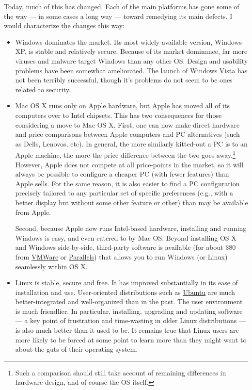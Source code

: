 \documentclass[11pt,article,oneside]{memoir}
\begin{document}
Today, much of this has changed. Each of the main platforms has gone some of the way --- in some cases a long way --- toward remedying its main defects. I would characterize the changes this way: 

\begin{itemize}
	\item Windows dominates the market. Its most widely-available version, Windows XP, is stable and relatively secure. Because of its market dominance, far more viruses and malware target Windows than any other OS. Design and usability problems have been somewhat ameliorated. The launch of Windows Vista has not been terribly successful, though it's problems do not seem to be ones related to security.

	\item Mac OS X runs only on Apple hardware, but Apple has moved all of its computers over to Intel chipsets. This has two consequences for those considering a move to Mac OS X. First, one can now make direct hardware and price comparisons between Apple computers and PC alternatives (such as Dells, Lenovos, etc). In general, the more similarly kitted-out a PC is to an Apple machine, the more the price difference between the two goes away.\footnote{Such a comparison should still take account of remaining differences in hardware design, and of course the OS itself.} However, Apple does not compete at all price-points in the market, so it will always be possible to configure a cheaper PC (with fewer features) than Apple sells. For the same reason, it is also easier to find a PC configuration precisely tailored to any particular set of specific preferences (e.g., with a better display but without some other feature or other) than may be available from Apple. 
	
	Second, because Apple now runs Intel-based hardware, installing and running Windows is easy, and even catered to by Mac OS. Beyond installing OS X and Windows side-by-side, third-party software is available (for about \$80 from \href{http://www.vmware.com/products/fusion/}{VMWare} or \href{http://www.parallels.com/}{Parallels}) that allows you to run Windows (or Linux) seamlessly within OS X. 
	\item Linux is stable, secure and free. It has improved substantially in its ease of installation and use. User-oriented distributions such as \href{http://www.ubuntu.com/}{Ubuntu} are much better-integrated and well-organized than in the past. The user environment is much friendlier. In particular, installing, upgrading and updating software --- a key point of frustration and time-wasting in older Linux distributions --- is also much better than it used to be. It remains true that Linux users are more likely to be forced at some point to learn more than they might want to about the guts of their operating system.
	
\end{itemize}
\end{document}

